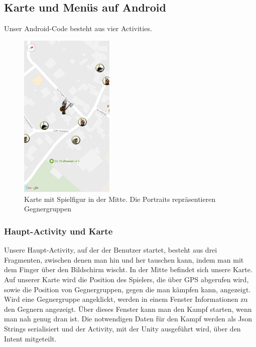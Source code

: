 \documentclass[extern,palatino]{cgBA}
\begin{document}
\subsection{Karte und Menüs auf Android}
Unser Android-Code besteht aus vier Activities. 
\begin{figure}[htb] 
	\centering
	\includegraphics[width=0.4\textwidth]{map.png}
	\caption{Karte mit Spielfigur in der Mitte. Die Portraits repräsentieren
		Gegnergruppen}
	\label{fig:Bild1}
\end{figure}
\subsubsection{Haupt-Activity und Karte}Unsere Haupt-Activity, auf der der Benutzer startet, besteht aus drei Fragmenten, zwischen denen man hin und her tauschen kann, indem man mit dem Finger über den Bildschirm wischt. In der Mitte befindet sich unsere Karte. Auf unserer Karte wird die Position des Spielers, die über GPS abgerufen wird, sowie die Position von Gegnergruppen, gegen die man kämpfen kann, angezeigt. Wird eine Gegnergruppe angeklickt, werden in einem Fenster Informationen zu den Gegnern angezeigt. Über dieses Fenster kann man den Kampf starten, wenn man nah genug dran ist. Die notwendigen Daten für den Kampf werden als Json Strings serialisiert und der Activity, mit der Unity ausgeführt wird, über den Intent mitgeteilt.
\end{document}
